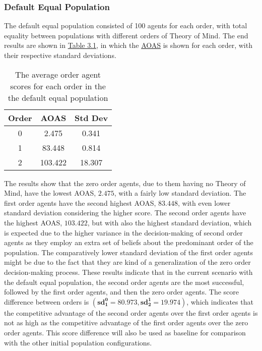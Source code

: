 \subsubsection{Default Equal Population}

The default equal population consisted of 100 agents for each order, with total equality between populations with different orders of Theory of Mind. The end results are shown in \hyperref[table:non-sig-default-equal-simple]{Table 3.1}, in which the \hyperref[eq:aoas]{AOAS} is shown for each order, with their respective standard deviations. 

\begin{table}[h]
\centering
\begin{tabular}{|c|c|c|}
\hline
Order & AOAS & Std Dev \\ \hline
0     & 2.475 & 0.341   \\
1     & 83.448 & 0.814  \\
2     & 103.422 & 18.307 \\ \hline
\end{tabular}
\caption{The average order agent scores for each order in the the default equal population}
\label{table:non-sig-default-equal-simple}
\end{table}

The results show that the zero order agents, due to them having no Theory of Mind, have the lowest AOAS, $\mathbf{2.475}$, with a fairly low standard deviation. The first order agents have the second highest AOAS, $\mathbf{83.448}$, with even lower standard deviation considering the higher score. The second order agents have the highest AOAS, $\mathbf{103.422}$, but with also the highest standard deviation, which is expected due to the higher variance in the decision-making of second order agents as they employ an extra set of beliefs about the predominant order of the population. The comparatively lower standard deviation of the first order agents might be due to the fact that they are kind of a generalization of the zero order decision-making process. These results indicate that in the current scenario with the default equal population, the second order agents are the most successful, followed by the first order agents, and then the zero order agents. The score difference between orders is $(\mathbf{sd^0_1 = 80.973}, \mathbf{sd^1_2 = 19.974})$, which indicates that the competitive advantage of the second order agents over the first order agents is not as high as the competitive advantage of the first order agents over the zero order agents. This score difference will also be used as baseline for comparison with the other initial population configurations.

